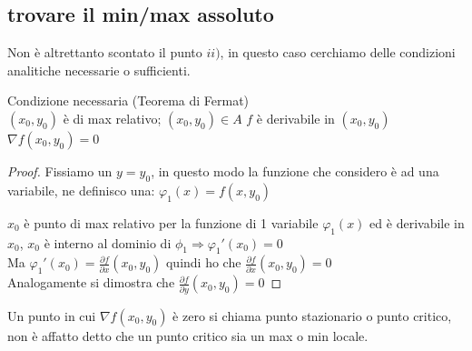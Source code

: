 \documentclass[a4paper, oneside]{article}
\begin{document}
        \subsection{trovare il min/max assoluto}
        Non è altrettanto scontato il punto $ii)$, in questo caso cerchiamo delle condizioni analitiche necessarie o sufficienti.\\
        \begin{proposition}
            Condizione necessaria (Teorema di Fermat)\\
             $(x_0,y_0)$ è di max relativo; $(x_0,y_0) \in A$  $f$ è derivabile in $(x_0,y_0)$\\ 
             $\nabla f(x_0,y_0) = 0$
        \end{proposition}
        \begin{proof}
            Fissiamo un $y = y_0$, in questo modo la funzione che considero è ad una variabile, ne definisco una: $\varphi_1 (x) = f(x, y_0)$
            \begin{center}
            \end{center}\noindent
            $x_0$ è punto di max relativo per la funzione di 1 variabile $\varphi_1(x)$ ed è derivabile in $x_0$, $x_0$ è interno al dominio di $\phi_1 \Rightarrow \varphi_1'(x_0) = 0$\\
            Ma $\varphi_1'(x_0) = \frac{\partial f}{\partial x}(x_0,y_0)$ quindi ho che $\frac{\partial f}{\partial x}(x_0,y_0) = 0$\\
            Analogamente si dimostra che $\frac{\partial f}{\partial y} (x_0,y_0) = 0$
        \end{proof}
        \begin{proposition}
            Un punto in cui $\nabla f(x_0,y_0)$ è zero si chiama punto stazionario o punto critico, non è affatto detto che un punto critico sia un max o min locale.
        \end{proposition}
\end{document}
